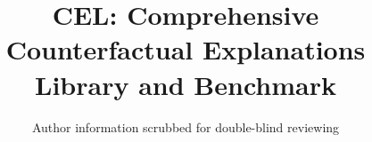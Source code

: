 \documentclass[runningheads]{llncs}
\begin{document}
\title{CEL: Comprehensive Counterfactual Explanations Library and Benchmark}

\author{Author information scrubbed for double-blind reviewing}
\institute{}

%

\maketitle
\end{document}
